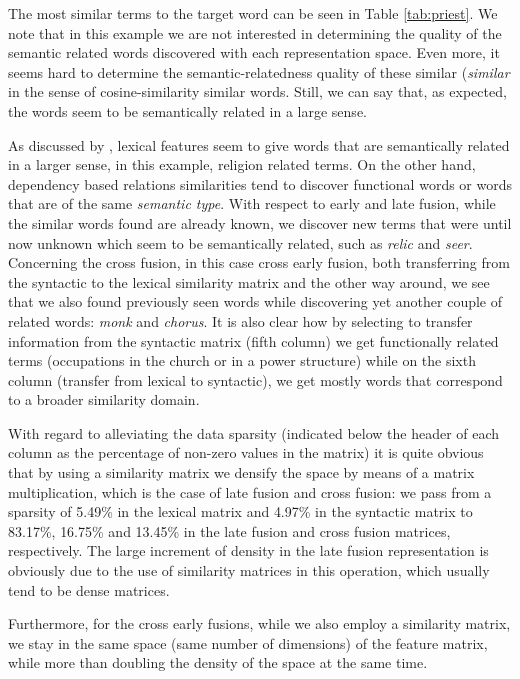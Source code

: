 The  most similar terms to the target word can be seen in Table \ref{tab:priest}. We note that in this example we are not interested in determining the quality of the semantic related words discovered with each representation space. Even more, it seems hard to determine the semantic-relatedness quality of these similar (\textit{similar} in the sense of cosine-similarity similar words. Still, we can say that, as expected, the words seem to be semantically related in a large sense.

As discussed by \cite{LevyG14}, lexical features seem to give words that are semantically related in a larger sense, in this example, religion related terms. On the other hand, dependency based relations similarities tend to discover functional words or words that are of the same \textit{semantic type}.
With respect to early and late fusion, while the similar words found are already known, we discover new terms that were until now unknown which seem to be semantically related, such as \textit{relic} and \textit{seer}. Concerning the cross fusion, in this case cross early fusion, both transferring from the syntactic to the lexical similarity matrix and the other way around, we see that we also found previously seen words while discovering yet another couple of related words: \textit{monk} and \textit{chorus}. It is also clear how by selecting to transfer information from the syntactic matrix (fifth column) we get functionally related terms (occupations in the church or in a power structure) while on the sixth column (transfer from lexical to syntactic), we get mostly words that correspond to a broader similarity domain.

With regard to alleviating the data sparsity (indicated below the header of each column as the percentage of non-zero values in the matrix) it is quite obvious that by using a similarity matrix we densify the space by means of a matrix multiplication, which is the case of late fusion and cross fusion: we pass from a sparsity of {5.49}\% in the lexical matrix and {4.97}\% in the syntactic matrix to {83.17}\%, {16.75}\% and {13.45}\% in the late fusion and cross fusion matrices, respectively. The large increment of density in the late fusion representation is obviously due to the use of similarity matrices in this operation, which usually tend to be dense matrices.

Furthermore, for the cross early fusions, while we also employ a similarity matrix, we stay in the same space (same number of dimensions) of the feature matrix, while more than doubling the density of the space at the same time. 

